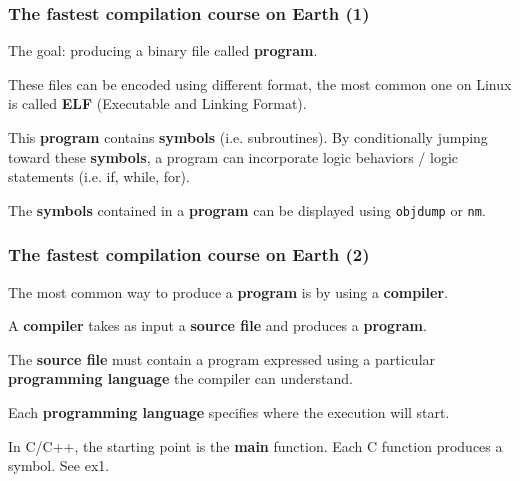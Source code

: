 \documentclass[hyperref={pdfpagelabels=false}]{beamer}
\begin{document}
\begin{frame}
\frametitle{The fastest compilation course on Earth (1)}

The goal: producing a binary file called \textbf{program}.

\vspace{0.3cm}

These files can be encoded using different format, the most common one
on Linux is called \textbf{ELF} (Executable and Linking Format).

\vspace{0.3cm}

This \textbf{program} contains \textbf{symbols} (i.e. subroutines).
By conditionally jumping toward these \textbf{symbols}, a program can
incorporate logic behaviors / logic statements (i.e. if, while, for).

\vspace{0.3cm}

The \textbf{symbols} contained in a \textbf{program} can be displayed
using \texttt{objdump} or \texttt{nm}.

\end{frame}

\begin{frame}[fragile]
\frametitle{The fastest compilation course on Earth (2)}

The most common way to produce a \textbf{program} is by using a
\textbf{compiler}.

\vspace{0.3cm}

A \textbf{compiler} takes as input a \textbf{source file} and produces
a \textbf{program}.

\vspace{0.3cm}

The \textbf{source file} must contain a program expressed using a
particular \textbf{programming language} the compiler can understand.

Each \textbf{programming language} specifies where the execution will
start.

In C/C++, the starting point is the \textbf{main} function. Each C
function produces a symbol. See ex1.


\end{frame}
\end{document}
